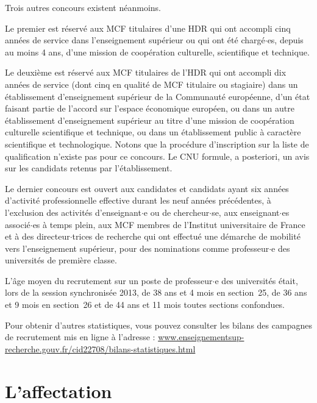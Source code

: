 Trois autres concours existent n\'eanmoins.

Le premier est r\'eserv\'e
aux MCF titulaires d'une HDR qui ont accompli cinq ann\'ees de service dans l'enseignement sup\'erieur ou qui ont \'et\'e charg\'e$\cdot$es, 
depuis au moins 4 ans, d'une mission de coop\'eration culturelle,
scientifique et technique.

Le deuxi\`eme est r\'eserv\'e aux MCF titulaires de l'HDR qui ont accompli dix ann\'ees de service
(dont cinq en qualit\'e de MCF titulaire ou stagiaire) dans un \'etablissement d'enseignement sup\'erieur
de la Communaut\'e europ\'eenne, d'un \'etat faisant partie de l'accord sur l'espace \'economique
europ\'een,
ou dans un autre \'etablissement d'enseignement sup\'erieur au titre d'une mission de coop\'eration culturelle scientifique et technique, 
ou dans un \'etablissement public \`a caract\`ere scientifique et technologique.
Notons que la proc\'edure d'inscription sur la liste de qualification n'existe pas pour ce concours.
Le CNU formule, a posteriori, un avis sur les candidats retenus par l'\'etablissement.

Le dernier concours est ouvert
aux candidates et candidats ayant six ann\'ees d'activit\'e professionnelle effective
durant les neuf ann\'ees pr\'ec\'edentes,
\`a l'exclusion des activit\'es d'enseignant$\cdot$e ou de chercheur$\cdot$se,
aux enseignant$\cdot$es associ\'e$\cdot$es \`a temps plein,
aux MCF membres de l'Institut universitaire de France
et \`a des directeur$\cdot$trices de recherche qui ont effectu\'e une d\'emarche de mobilit\'e
vers l'enseignement sup\'erieur, pour des nominations comme professeur$\cdot$e des universit\'es de premi\`ere classe.

L'\^age moyen du recrutement sur un poste de professeur$\cdot$e des
universit\'es \'etait, lors de la session synchronis\'ee 2013, 
de 38 ans et 4 mois en section~25, 
de 36 ans et 9 mois en section~26 et 
de 44 ans et 11 mois toutes sections confondues.

Pour obtenir d'autres statistiques, vous pouvez consulter les
bilans des campagnes de recrutement mis en ligne \`a l'adresse :
{\url{www.enseignementsup-recherche.gouv.fr/cid22708/bilans-statistiques.html}}








\section{L'affectation}

